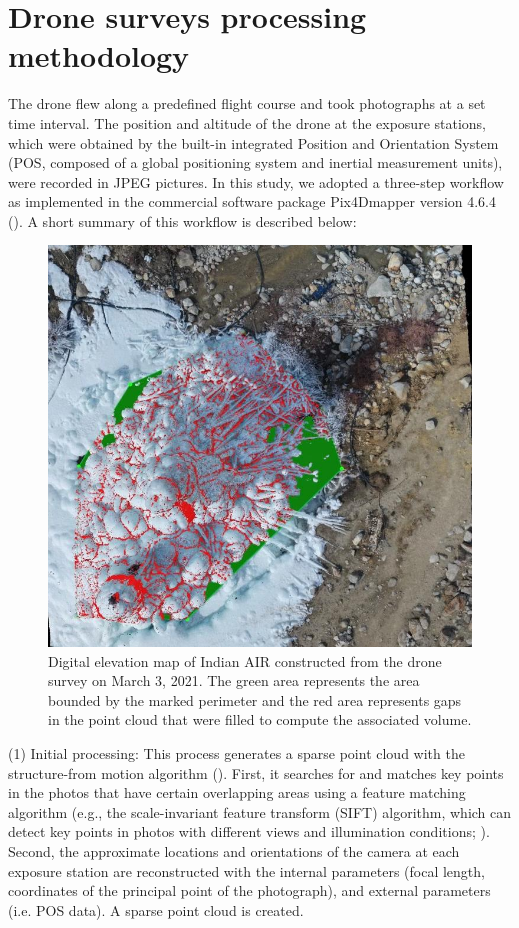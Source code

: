 \section{Drone surveys processing methodology}
\label{sec:drone_method}

The drone flew along a predefined flight course and took photographs at a set time interval. The
position and altitude of the drone at the exposure stations, which were obtained by the built-in integrated
Position and Orientation System (POS, composed of a global positioning system and inertial measurement units),
were recorded in JPEG pictures. In this study, we adopted a three-step workflow as implemented in the
commercial software package Pix4Dmapper version 4.6.4 (\cite{pix4dsaPix4DmapperUserManual2020}). A short summary of this workflow is
described below:

\begin{figure}
	\begin{center}
		\includegraphics[width=12 cm]{figs/pix4d.jpg}
	\end{center}
	\caption{Digital elevation map of Indian AIR constructed from the drone survey on March 3, 2021. The green
		area represents the area bounded by the marked perimeter and the red area represents gaps in the point cloud
    that were filled to compute the associated volume.
	}
	\label{fig:DEM}
\end{figure}

(1) Initial processing: This process generates a sparse point cloud with the structure-from motion algorithm
(\cite{turnerAutomatedTechniqueGenerating2012}). First, it searches for and matches key points in the photos that have certain overlapping
areas using a feature matching algorithm (e.g., the scale-invariant feature transform (SIFT) algorithm, which can
detect key points in photos with different views and illumination conditions;
\cite{loweDistinctiveImageFeatures2004}). Second, the approximate locations and orientations of the camera at
each exposure station are reconstructed with the internal parameters (focal length, coordinates of the principal
point of the photograph), and external parameters (i.e. POS data). A sparse point cloud is created.

